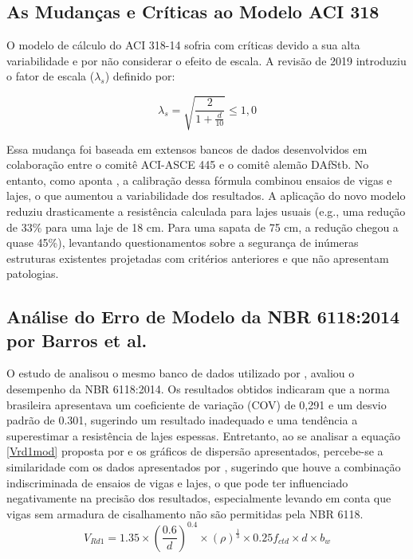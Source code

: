 \subsection{As Mudanças e Críticas ao Modelo ACI 318}
O modelo de cálculo do ACI 318-14 sofria com críticas devido a sua alta variabilidade e por não considerar o efeito de escala. A revisão de 2019 introduziu o fator de escala ($\lambda_s$) definido por:

\begin{equation}
    \lambda_s = \sqrt{\frac{2}{1+\frac{d}{10}}}\leq 1,0
\end{equation}

Essa mudança foi baseada em extensos bancos de dados desenvolvidos em colaboração entre o comitê ACI-ASCE 445 e o comitê alemão DAfStb. No entanto, como aponta \textcite{Marquesi2021}, a calibração dessa fórmula combinou ensaios de vigas e lajes, o que aumentou a variabilidade dos resultados.
A aplicação do novo modelo reduziu drasticamente a resistência calculada para lajes usuais (e.g., uma redução de 33\% para uma laje de 18 cm. Para uma sapata de 75 cm, a redução chegou a quase 45\%), levantando questionamentos sobre a segurança de inúmeras estruturas existentes projetadas com critérios anteriores e que não apresentam patologias.

\subsection{Análise do Erro de Modelo da NBR 6118:2014 por Barros et al.}

O estudo de \textcite{Barros2021} analisou o mesmo banco de dados utilizado por \textcite{Kuchma2019}, avaliou o desempenho da NBR 6118:2014. Os resultados obtidos indicaram que a norma brasileira apresentava um coeficiente de variação (COV) de 0,291 e um desvio padrão de 0.301, sugerindo um resultado inadequado e uma tendência a superestimar a resistência de lajes espessas. Entretanto, ao se analisar a equação \ref{Vrd1mod} proposta por \textcite{Barros2021} e os gráficos de dispersão apresentados, percebe-se a similaridade com os dados apresentados por \textcite{Kuchma2019}, sugerindo que houve a combinação indiscriminada de ensaios de vigas e lajes, o que pode ter influenciado negativamente na precisão dos resultados, especialmente levando em conta que vigas sem armadura de cisalhamento não são permitidas pela NBR 6118.
\begin{equation}
    V_{Rd1} = 1.35 \times \left(\frac{0.6}{d}\right)^{0.4} \times (\rho)^\frac{1}{3} \times 0.25f_{ctd}\times d \times b_w
    \label{Vrd1mod}
\end{equation}

